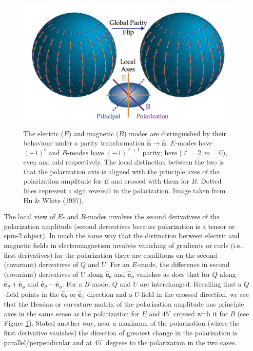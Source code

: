 \documentclass[a4paper,10pt]{article}
\begin{document}
\begin{figure}[h]
\includegraphics[width=16cm]{figures/EBmodes.png}
\centering
\caption{\footnotesize{The electric ($E$) and magnetic ($B$) modes are distinguished by their behaviour under a parity transformation $\bm{\hat{n}}\rightarrow\bm{\hat{n}}$. $E$-modes have $(-1)^\ell$ and $B$-modes have $(-1)^{\ell+1}$ parity; here ($\ell=2,m=0$), even and odd respectively. The local distinction between the two is that the polarization axis is aligned with the principle axes of the polarization amplitude for $E$ and crossed with them for $B$. Dotted lines represent a sign reversal in the polarization. Image taken from Hu \& White (1997).}}
\label{fig:ebmodes}
\end{figure}

{\noindent}The local view of $E$- and $B$-modes involves the second derivatives of the polarization amplitude (second derivatives because polarization is a tensor or spin-$2$ object). In much the same way that the distinction between electric and magnetic fields in electromagnetism involves vanishing of gradients or curls (i.e., first derivatives) for the polarization there are conditions on the second (covariant) derivatives of $Q$ and $U$. For an $E$-mode, the difference in second (covariant) derivatives of $U$ along $\bm{\hat{e}}_\theta$ and $\bm{\hat{e}}_\phi$ vanishes as does that for $Q$ along $\bm{\hat{e}}_\theta+\bm{\hat{e}}_\phi$ and $\bm{\hat{e}}_\theta-\bm{\hat{e}}_\phi$. For a $B$-mode, $Q$ and $U$ are interchanged. Recalling that a $Q$-field points in the $\bm{\hat{e}}_\theta$ or $\bm{\hat{e}}_\phi$ direction and a $U$-field in the crossed direction, we see that the Hessian or curvature matrix of the polarization amplitude has principle axes in the same sense as the polarization for $E$ and $45^\circ$ crossed with it for $B$ (see Figure \ref{fig:ebmodes}). Stated another way, near a maximum of the polarization (where the first derivative vanishes) the direction of greatest change in the polarization is parallel/perpendicular and at $45^\circ$ degrees to the polarization in the two cases.
\end{document}
